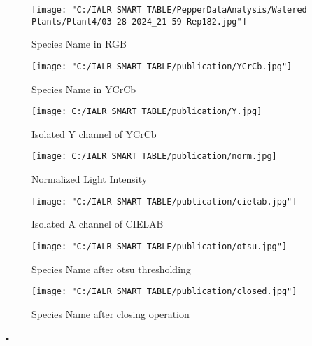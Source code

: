 \documentclass[12pt]{article}
\begin{document}
\begin{figure}[H]
\centering
\begin{minipage}{0.45\textwidth}
  \centering
  \texttt{[image: "C:/IALR SMART TABLE/PepperDataAnalysis/Watered Plants/Plant4/03-28-2024\_21-59-Rep182.jpg"]}
  \caption{Species Name in RGB}
  \label{fig:species_rgb}
\end{minipage}%
\hfill
\begin{minipage}{0.45\textwidth}
  \centering
  \texttt{[image: "C:/IALR SMART TABLE/publication/YCrCb.jpg"]}
  \caption{Species Name in YCrCb}
  \label{fig:species_ycrcb}
\end{minipage}
\end{figure}

\begin{figure}[H]
\centering
\begin{minipage}{0.45\textwidth}
  \centering
  \texttt{[image: C:/IALR SMART TABLE/publication/Y.jpg]}
  \caption{Isolated Y channel of YCrCb}
  \label{fig:species_Y}
\end{minipage}%
\hfill
\begin{minipage}{0.45\textwidth}
  \centering
  \texttt{[image: C:/IALR SMART TABLE/publication/norm.jpg]}
  \caption{Normalized Light Intensity}
  \label{fig:species_gaussdiff}
\end{minipage}
\end{figure}

\begin{figure}[H]
\centering
\begin{minipage}{0.45\textwidth}
  \centering
  \texttt{[image: "C:/IALR SMART TABLE/publication/cielab.jpg"]}
  \caption{Isolated A channel of CIELAB}
  \label{fig:species_lab}
\end{minipage}%
\hfill
\begin{minipage}{0.45\textwidth}
  \centering
  \texttt{[image: "C:/IALR SMART TABLE/publication/otsu.jpg"]}
  \caption{Species Name after otsu thresholding}
  \label{fig:species_otsu}
\end{minipage}
\end{figure}

\begin{figure}
\centering
\texttt{[image: "C:/IALR SMART TABLE/publication/closed.jpg"]}
\caption{Species Name after closing operation}
\label{fig:species_closed}
\end{figure}•
\end{document}
